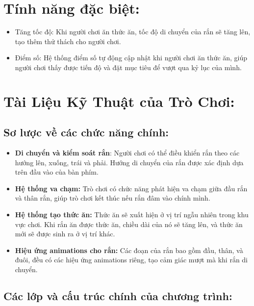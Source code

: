 \documentclass[a4paper, 12pt]{article}
\begin{document}
\section{\textbf{Tính năng đặc biệt:}}

\begin{itemize}
    \item Tăng tốc độ: Khi người chơi ăn thức ăn, tốc độ di chuyển của rắn sẽ tăng lên, tạo thêm thử thách cho người chơi.
\end{itemize}

\begin{itemize}
    \item Điểm số: Hệ thống điểm số tự động cập nhật khi người chơi ăn thức ăn, giúp người chơi thấy được tiến độ và đặt mục tiêu để vượt qua kỷ lục của mình.
\end{itemize}

\section{Tài Liệu Kỹ Thuật của Trò Chơi:}

\subsection{Sơ lược về các chức năng chính:}

\begin{itemize}
    \item \textbf{Di chuyển và kiểm soát rắn}: Người chơi có thể điều khiển rắn theo các hướng lên, xuống, trái và phải. Hướng di chuyển của rắn được xác định dựa trên đầu vào của bàn phím.

    \item \textbf{Hệ thống va chạm:} Trò chơi có chức năng phát hiện va chạm giữa đầu rắn và thân rắn, giúp trò chơi kết thúc nếu rắn đâm vào chính mình.

    \item \textbf{Hệ thống tạo thức ăn:} Thức ăn sẽ xuất hiện ở vị trí ngẫu nhiên trong khu vực chơi. Khi rắn ăn được thức ăn, chiều dài của nó sẽ tăng lên, và thức ăn mới sẽ được sinh ra ở vị trí khác.

    \item \textbf{Hiệu ứng animations cho rắn:} Các đoạn của rắn bao gồm đầu, thân, và đuôi, đều có các hiệu ứng animations riêng, tạo cảm giác mượt mà khi rắn di chuyển.
\end{itemize}

\subsection{Các lớp và cấu trúc chính của chương trình:}
\end{document}

